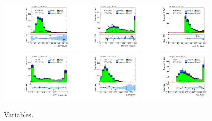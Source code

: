 \begin{figure}[tp]
  \includegraphics[width=0.32\textwidth]{figures/analysis/vbf-WlvCR/met-pt-hi}
  \includegraphics[width=0.32\textwidth]{figures/analysis/vbf-WlvCR/mMMC}
  \includegraphics[width=0.32\textwidth]{figures/analysis/vbf-WlvCR/mT-hi}
  \includegraphics[width=0.32\textwidth]{figures/analysis/vbf-WlvCR/met-phi-centrality}
  \includegraphics[width=0.32\textwidth]{figures/analysis/vbf-WlvCR/H-pt-hi}
  \includegraphics[width=0.32\textwidth]{figures/analysis/vbf-WlvCR/mvis}
  \caption{Variables.}
  \label{fig:backgrounds-WlvCR-taus}
\end{figure}

